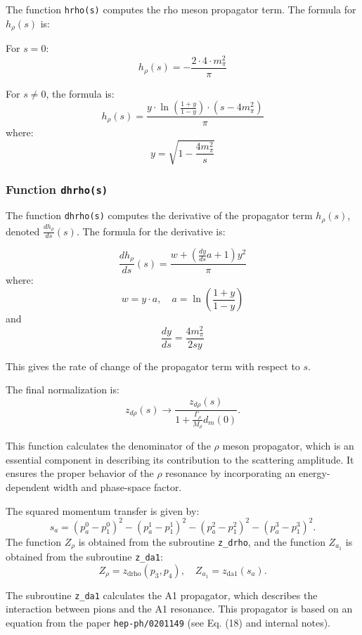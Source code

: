 \documentclass[12pt]{article}
\begin{document}
\begin{itemize}
The function \texttt{hrho(s)} computes the rho meson propagator term. The formula for \( h_\rho(s) \) is:

For \( s = 0 \):
\[
h_\rho(s) = - \frac{2 \cdot 4 \cdot m_\pi^2}{\pi}
\]

For \( s \neq 0 \), the formula is:
\[
h_\rho(s) = \frac{y \cdot \ln\left(\frac{1 + y}{1 - y}\right) \cdot (s - 4m_\pi^2)}{\pi}
\]
where:
\[
y = \sqrt{1 - \frac{4m_\pi^2}{s}}
\]

\subsubsection*{Function \texttt{dhrho(s)}}

The function \texttt{dhrho(s)} computes the derivative of the propagator term \( h_\rho(s) \), denoted \( \frac{d h_\rho}{d s}(s) \). The formula for the derivative is:

\[
\frac{d h_\rho}{d s}(s) = \frac{w + \left( \frac{dy}{ds} a + 1 \right) y^2}{\pi}
\]
where:
\[
w = y \cdot a, \quad a = \ln\left(\frac{1 + y}{1 - y}\right)
\]
and
\[
\frac{dy}{ds} = \frac{4 m_\pi^2}{2 s y}
\]

This gives the rate of change of the propagator term with respect to \( s \).


The final normalization is:
\begin{equation}
z_{d\rho}(s) \to \frac{z_{d\rho}(s)}{1 + \frac{\Gamma_{\rho}}{M_{\rho}} d_m(0)}.
\end{equation}

This function calculates the denominator of the $\rho$ meson propagator, which is an essential component in describing its contribution to the scattering amplitude. It ensures the proper behavior of the $\rho$ resonance by incorporating an energy-dependent width and phase-space factor.




The squared momentum transfer is given by:
\[
s_a = (p_a^0 - p_1^0)^2 - (p_a^1 - p_1^1)^2 - (p_a^2 - p_1^2)^2 - (p_a^3 - p_1^3)^2.
\]
The function \( Z_{\rho} \) is obtained from the subroutine \texttt{z\_drho}, and the function \( Z_{a_1} \) is obtained from the subroutine \texttt{z\_da1}:
\[
Z_{\rho} = z_{\text{drho}}(p_3, p_4), \quad Z_{a_1} = z_{\text{da1}}(s_a).
\]

The subroutine \texttt{z\_da1} calculates the A1 propagator, which describes the interaction between pions and the A1 resonance. This propagator is based on an equation from the paper \texttt{hep-ph/0201149} (see Eq. (18) and internal notes). 


\end{itemize}
\end{document}
